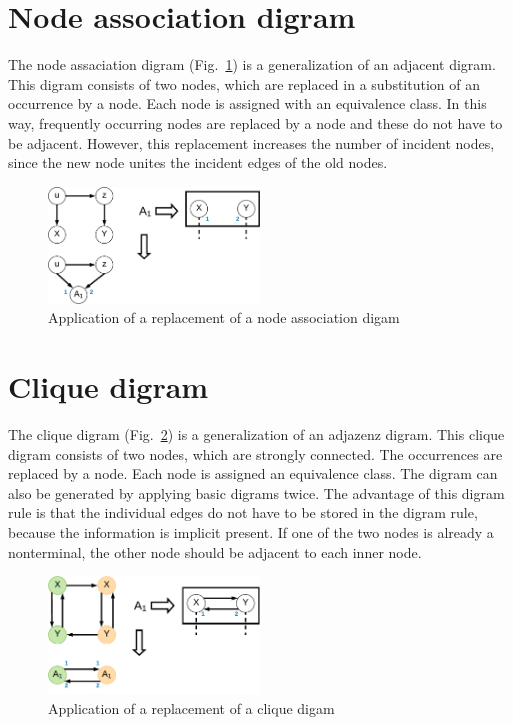 \documentclass[a4paper]{scrartcl}
\begin{document}
\section{Node association digram}

The node assaciation digram (Fig.~\ref{fig:nodeAssociationDigram}) is a generalization of an adjacent digram.
This digram consists of two nodes, which are replaced in a substitution of an occurrence by a node. Each node is assigned with an equivalence class.
In this way, frequently occurring nodes are replaced by a node and these do not have to be adjacent. However, this replacement increases the number of incident nodes, since the new node unites the incident edges of the old nodes.

\begin{figure}[h]
	\centering
	\includegraphics[width=0.5\textwidth]{img/nodeAssociationDigram}
	\caption{Application of a replacement of a node association digam}
	\label{fig:nodeAssociationDigram}
\end{figure}


\section{Clique digram}

The clique digram (Fig.~\ref{fig:cliqueDigram}) is a generalization of an adjazenz digram.
This clique digram consists of two nodes, which are strongly connected. The occurrences are replaced by a node. Each node is assigned an equivalence class. The digram can also be generated by applying basic digrams twice. The advantage of this digram rule is that the individual edges do not have to be stored in the digram rule, because the information is implicit present. If one of the two nodes is already a nonterminal, the other node should be adjacent to each inner node.

\begin{figure}[h]
	\centering
	\includegraphics[width=0.5\textwidth]{img/cliqueDigram}
	\caption{Application of a replacement of a clique digam}
	\label{fig:cliqueDigram}
\end{figure}
\end{document}
